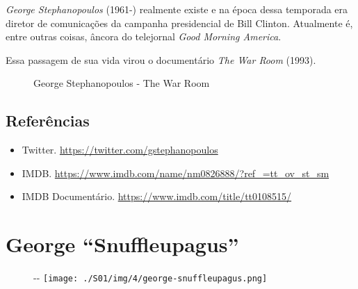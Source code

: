 \emph{George Stephanopoulos} (1961-) realmente existe e na época dessa
temporada era diretor de comunicações da campanha presidencial de Bill
Clinton. Atualmente é, entre outras coisas, âncora do telejornal
\emph{Good Morning America}.

Essa passagem de sua vida virou o documentário \emph{The War Room}
(1993).

\begin{figure}
  \centering
    \caption{George Stephanopoulos - The War Room\label{fig:george-stephanopoulos-the-war-room}}
\end{figure}

\hypertarget{referuxeancias-3}{%
\subsection{Referências}\label{referuxeancias-3}}

\begin{itemize}
\tightlist
\item
  \sloppy Twitter. \url{https://twitter.com/gstephanopoulos}
\item
  \sloppy IMDB. \url{https://www.imdb.com/name/nm0826888/?ref_=tt_ov_st_sm}
\item
  \sloppy IMDB Documentário. \url{https://www.imdb.com/title/tt0108515/}
\end{itemize}

\hypertarget{george-snuffleupagus}{%
\section{George ``Snuffleupagus''}\label{george-snuffleupagus}}

\begin{figure}[!ht]
  \begin{adjustwidth}{-\oddsidemargin-1in}{-\rightmargin}
    \centering
    \texttt{[image: ./S01/img/4/george-snuffleupagus.png]}
  \end{adjustwidth}
\end{figure}

